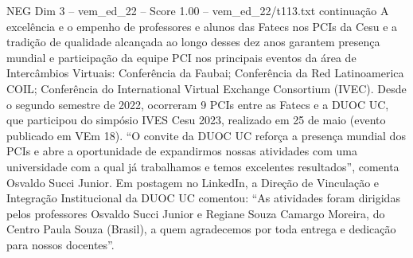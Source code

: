 \begin{textsample}{NEG Dim 3 – vem\_ed\_22 – Score 1.00 – vem\_ed\_22/t113.txt}  \label{ex:f3_neg_056}
continuação A excelência e o empenho de professores e alunos das Fatecs nos PCIs da Cesu e a tradição de qualidade alcançada ao longo desses dez anos garantem presença mundial e participação da equipe PCI nos principais eventos da área de Intercâmbios Virtuais: Conferência da Faubai; Conferência da Red Latinoamerica COIL; Conferência do International Virtual Exchange Consortium (IVEC).
Desde o segundo semestre de 2022, ocorreram 9 PCIs entre as Fatecs e a DUOC UC, que participou do simpósio IVES Cesu 2023, realizado em 25 de maio (evento publicado em VEm 18). “O convite da DUOC UC reforça a presença mundial dos PCIs e abre a oportunidade de expandirmos nossas atividades com uma universidade com a qual já trabalhamos e temos excelentes resultados”, comenta Osvaldo Succi Junior.
Em postagem no LinkedIn, a Direção de Vinculação e Integração Institucional da DUOC UC comentou: “As atividades foram dirigidas pelos professores Osvaldo Succi Junior e Regiane Souza Camargo Moreira, do Centro Paula Souza (Brasil), a quem agradecemos por toda entrega e dedicação para nossos docentes”.

\end{textsample}
